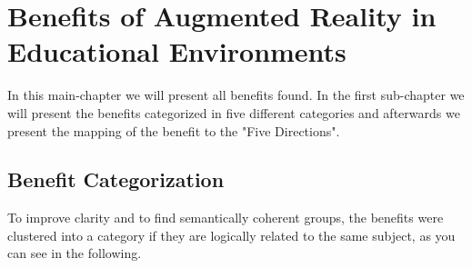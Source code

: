 \section{Benefits of Augmented Reality in Educational Environments}
\label{sec:Benefits}
In this main-chapter we will present all benefits found. In the first sub-chapter we will present the benefits categorized in five different categories and afterwards we present the mapping of the benefit to the "Five Directions".
\subsection{Benefit Categorization}
\label{subsec:BenefitCategorization}
To improve clarity and to find semantically coherent groups, the benefits were clustered into a category if they are logically related to the same subject, as you can see in the following.

% 
